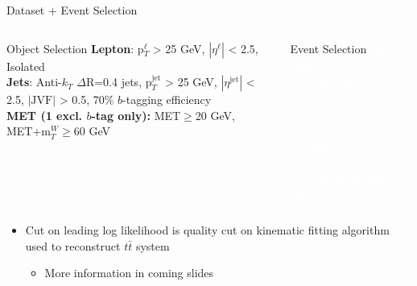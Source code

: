 \documentclass{beamer}
\begin{document}
{\begin{frame}{Dataset + Event Selection}
\begin{columns}
      \begingroup
      \small
      \begin{block}{Object Selection}
        \scriptsize
        \textbf{Lepton}: p$_{T}^{\ell}$ > 25 GeV, $|\eta^{\ell}|$ < 2.5,\\ Isolated\\
        \textbf{Jets}: Anti-$k_{T}$ $\Delta$R=0.4 jets, p$_{T}^{\text{jet}}$ > 25 GeV, $|\eta^{\text{jet}}|$ < 2.5, $|\text{JVF}|$ > 0.5, 70\% $b$-tagging efficiency\\
        \textbf{MET (1 excl. $b$-tag only):} MET$\geq$20 GeV, MET+m$_{T}^{W}\geq 60$ GeV\\
      \end{block}
      \endgroup
      \begingroup
      \small
      \begin{block}{Event Selection}
        \scriptsize
        \textcolor{white}{
          Lepton trigger\\
          At least 1 primary vertex with $\geq 5$ tracks\\
          N$_{\ell}=1$\\
          N$_{jets}\geq 4$\\
          Categorize by N$_{b\text{-tags}} =1$ or $\geq 2$\\
          Leading log likelihood > -48
        }
      \end{block}
      \endgroup
    \end{columns}
    \begin{itemize}
      \small
    \item Cut on leading log likelihood is quality cut on kinematic fitting algorithm used to reconstruct $t\bar{t}$ system
      \begin{itemize}
      \item More information in coming slides
      \end{itemize}
    \end{itemize}        

  \end{frame}

}
\end{document}
